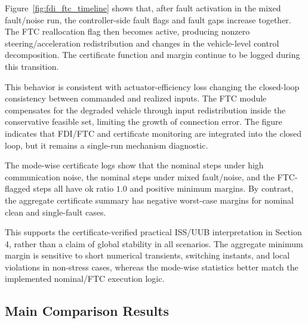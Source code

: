 \documentclass[twocolumn,3p,times,procedia]{elsarticle}
\begin{document}
Figure~\ref{fig:fdi_ftc_timeline} shows that, after fault activation in the mixed fault/noise run, the controller-side fault flags and fault gaps increase together. The FTC reallocation flag then becomes active, producing nonzero steering/acceleration redistribution and changes in the vehicle-level control decomposition. The certificate function and margin continue to be logged during this transition.

This behavior is consistent with actuator-efficiency loss changing the closed-loop consistency between commanded and realized inputs. The FTC module compensates for the degraded vehicle through input redistribution inside the conservative feasible set, limiting the growth of connection error. The figure indicates that FDI/FTC and certificate monitoring are integrated into the closed loop, but it remains a single-run mechanism diagnostic.

The mode-wise certificate logs show that the nominal steps under high communication noise, the nominal steps under mixed fault/noise, and the FTC-flagged steps all have ok ratio $1.0$ and positive minimum margins. By contrast, the aggregate certificate summary has negative worst-case margins for nominal clean and single-fault cases.

This supports the certificate-verified practical ISS/UUB interpretation in Section 4, rather than a claim of global stability in all scenarios. The aggregate minimum margin is sensitive to short numerical transients, switching instants, and local violations in non-stress cases, whereas the mode-wise statistics better match the implemented nominal/FTC execution logic.

\subsection{Main Comparison Results}
\end{document}
